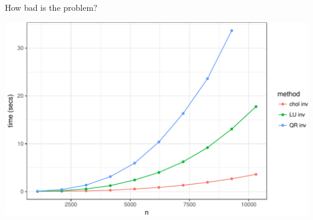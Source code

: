\documentclass[11pt,ignorenonframetext,]{beamer}
\begin{document}
\begin{frame}{How bad is the problem?}
\protect\hypertarget{how-bad-is-the-problem}{}

\begin{center}\includegraphics[width=\textwidth]{Lec21_files/figure-beamer/unnamed-chunk-1-1} \end{center}

\end{frame}
\end{document}
